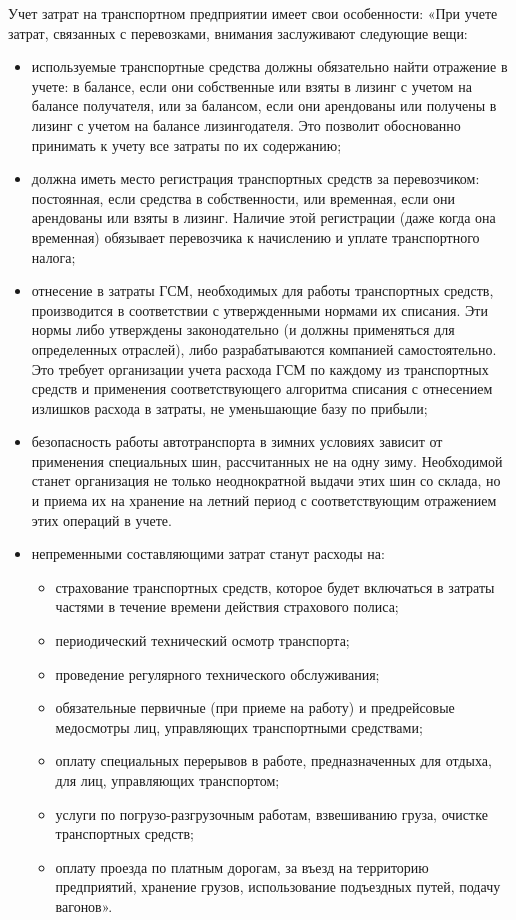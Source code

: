 \documentclass{lstu-diploma}
\begin{document}
Учет затрат на транспортном предприятии имеет свои особенности: «При учете
затрат, связанных с перевозками, внимания заслуживают следующие вещи:

\begin{itemize}
    \item используемые транспортные средства должны обязательно найти отражение
		в учете: в балансе, если они собственные или взяты в лизинг с учетом на
		балансе получателя, или за балансом, если они арендованы или получены в
		лизинг с учетом на балансе лизингодателя. Это позволит обоснованно
		принимать к учету все затраты по их содержанию;
	\item должна иметь место регистрация транспортных средств за перевозчиком:
		постоянная, если средства в собственности, или временная, если они
		арендованы или взяты в лизинг. Наличие этой регистрации (даже когда она
		временная) обязывает перевозчика к начислению и уплате транспортного
		налога;
	\item отнесение в затраты ГСМ, необходимых для работы транспортных средств,
		производится в соответствии с утвержденными нормами их списания. Эти
		нормы либо утверждены законодательно (и должны применяться для
		определенных отраслей), либо разрабатываются компанией самостоятельно.
		Это требует организации учета расхода ГСМ по каждому из транспортных
		средств и применения соответствующего алгоритма списания с отнесением
		излишков расхода в затраты, не уменьшающие базу по прибыли;
	\item безопасность работы автотранспорта в зимних условиях зависит от
		применения специальных шин, рассчитанных не на одну зиму. Необходимой
		станет организация не только неоднократной выдачи этих шин со склада, но
		и приема их на хранение на летний период с соответствующим отражением
		этих операций в учете.
	\item непременными составляющими затрат станут расходы на:
	
	\begin{itemize}
	    \item страхование транспортных средств, которое будет включаться в
			затраты частями в течение времени действия страхового полиса;
		\item периодический технический осмотр транспорта;
		\item проведение регулярного технического обслуживания;
		\item обязательные первичные (при приеме на работу) и предрейсовые
			медосмотры лиц, управляющих транспортными средствами;
		\item оплату специальных перерывов в работе, предназначенных для отдыха,
			для лиц, управляющих транспортом;
		\item услуги по погрузо-разгрузочным работам, взвешиванию груза, очистке
			транспортных средств;
		\item оплату проезда по платным дорогам, за въезд на территорию
			предприятий, хранение грузов, использование подъездных путей, подачу
			вагонов».
	\end{itemize}
\end{itemize}
\end{document}
